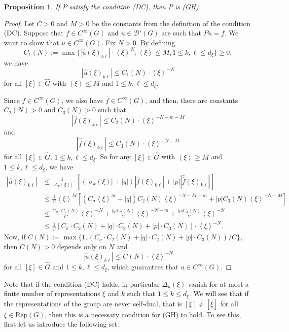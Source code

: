 \documentclass[sn-mathphys-num]{sn-jnl}%
\numberwithin{equation}{section}
\theoremstyle{thmstyleone}
\newtheorem{proposition}[theorem]{Proposition}
\theoremstyle{thmstyletwo}
\theoremstyle{thmstylethree}
\def\jp#1{{\left\langle{#1}\right\rangle}}
\begin{document}
\begin{proposition}\label{firstprop} If $P$ satisfy the condition (DC), then $P$ is (GH).
\end{proposition}

\begin{proof} Let $C>0$ and $M>0$ be the constants from the definition of the condition (DC). Suppose that $f \in C^\infty(G)$ and $u \in \mathcal{D}'(G)$ are such that $Pu=f$. We want to show that $u \in C^\infty(G)$. Fix $N>0$. By defining
	$$C_1(N):= \max \{|\widehat{u}(\xi)_{k\ell}|\cdot \jp{\xi}^N; \jp{\xi}\leq M, 1 \leq k,\ell \leq d_\xi\} \geq 0,$$
we have
$$|\widehat{u}(\xi)_{k\ell}| \leq C_1(N)\cdot \jp{\xi}^{-N}$$
for all $[\xi] \in \widehat{G}$ with $\jp{\xi} \leq M$ and $1 \leq k,\ell \leq d_\xi$.	
	
Since $f \in C^\infty(G)$, we also have $\overline{f} \in C^\infty(G)$, and then, there are constants $C_2(N)>0$ and $C_3(N)>0$ such that
$$|\widehat{f}(\xi)_{k\ell} | \leq C_2(N)\cdot \jp{\xi}^{-N-m-M}$$
and
$$|\widehat{ \overline{f}}(\xi)_{k\ell}| \leq C_3(N) \cdot \jp{\xi}^{-N-M}$$
for all $[\xi] \in \widehat{G}$, $1 \leq k,\ell \leq d_\xi$. So for any $[\xi] \in \widehat{G}$ with $\jp{\xi}\geq M$ and $1 \leq k,\ell \leq d_\xi$, we have 
\begin{align} 
	|\widehat{u}(\xi)_{k\ell}| & \leq  \frac{1}{|\Delta_k(\xi)|} \cdot \left[(|\sigma_k(\xi)|+|q|)|\widehat{f}(\xi)_{k\ell}|+ |p|| \widehat{\overline{f}}(\xi)_{k\ell}| \right]  \nonumber \\
	& \leq  \frac{1}{C}\jp{\xi}^M \left [ (C_\sigma \jp{\xi}^m+|q|)C_2(N) \jp{\xi}^{-N-M-m}+|p|C_3(N) \jp{\xi}^{-N-M}  \right ] \nonumber \\
	&  \leq \frac{C_\sigma\cdot C_2(N)}{C}\jp{\xi}^{-N}+ \frac{|q|C_2(N)}{C}\jp{\xi}^{-N-m}+\frac{|p|C_3(N)}{C}\jp{\xi}^{-N} \nonumber \\
	& \leq \frac{1}{C}\left[ C_\sigma \cdot C_2(N)+|q|\cdot C_2(N)+|p|\cdot C_3(N)\right]\cdot \jp{\xi}^{-N}. 
\end{align} 
Now, if $C(N):= \max  \{ 1, (C_\sigma \cdot C_2(N)+|q|\cdot C_2(N)+|p|\cdot C_3(N))/C\}$, then $C(N)>0$ depends only on $N$ and
$$|\widehat{u}(\xi)_{k\ell}| \leq C(N)\cdot \jp{\xi}^{-N}$$
for all $[\xi] \in \widehat{G}$ and $1 \leq k,\ell \leq d_\xi$, which guarantees that $u \in C^\infty(G)$.

\end{proof}

Note that if the condition (DC) holds, in particular $\Delta_k(\xi)$ vanish for at most a finite number of representations $\xi$ and $k$ such that $1 \leq k \leq d_\xi$. We will see that if the representations of the group are never self-dual, that is $[\xi] \neq [\overline{\xi}]$ for all $\xi  \in \textrm{Rep}(G)$, then this is a necessary condition for (GH) to hold. To see this, first let us introduce the following set:
\end{document}
